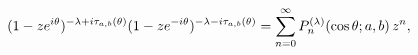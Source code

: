 \[(1-ze^{i\theta})^{-\lambda+i\tau_{a,b}(\theta)}(1-ze^{-i\theta})^{-\lambda-i%
\tau_{a,b}(\theta)}=\sum_{n=0}^{\infty}\mathop{P^{(\lambda)}_{n}\/}\nolimits\!%
\left(\mathop{\cos\/}\nolimits\theta;a,b\right)z^{n},\]